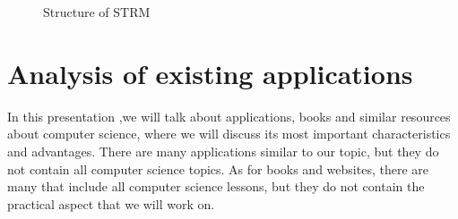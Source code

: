 \begin{figure} [h!]%
 	\vspace*{13pt}
 	\vspace*{13pt}               
 	\caption{Structure of STRM} 
 	\label{fig:STRM}
 \end{figure} 

 \section{Analysis of existing applications}
 In this presentation ,we will talk about applications, books and similar resources about computer science, 
 where we will discuss its most important characteristics and advantages.
 There are many applications similar to our topic, but they do not contain all computer science topics.
 As for books and websites, there are many that include all computer science lessons, but they do not 
 contain the practical aspect that we will work on.
 
